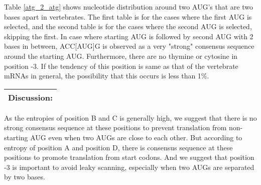Table \ref{atg_2_atg} shows nucleotide distribution around two AUG's that are
two bases apart in vertebrates.  
The first table is for the cases where the
first AUG is selected, and the second table is
for the cases where the second AUG is selected, skipping the first.
In case where starting AUG is followed by second AUG with 2 bases in between, 
ACC[AUG]G is observed as 
a very "strong" consensus sequence around the starting AUG. Furthermore,
there are no thymine or cytosine in position -3. If the tendency of this
position is same as that of the vertebrate mRNAs in general, 
the possibility that this
occurs is less than 1\%. 


\vspace{2ex}
\noindent
\begin{tabular}{|l|}
\hline
Discussion:\\
\hline
\end{tabular}

As the entropies of position B and C is generally high, we suggest
that there is no strong consensus sequence at these positions to
prevent translation from non-starting AUG even when two AUGs are close 
to each other. But according to entropy of position A and position D,
there is consensus sequence at these positions to promote translation
from start codons. And we suggest that position -3 is important to
avoid leaky scanning, especially when two AUGs are separated by two bases.







